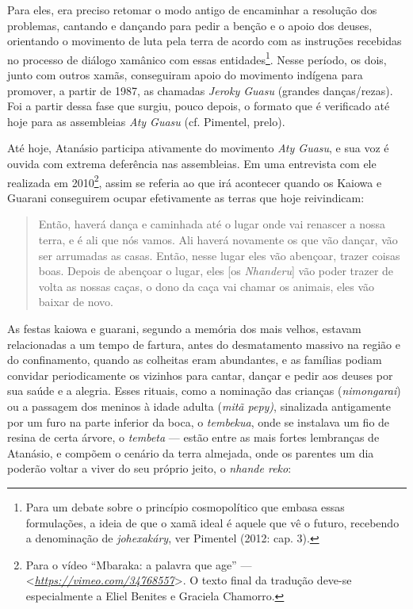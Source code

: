 Para eles, era preciso retomar o modo antigo de encaminhar a resolução
dos problemas, cantando e dançando para pedir a benção e o apoio dos
deuses, orientando o movimento de luta pela terra de acordo com as
instruções recebidas no processo de diálogo xamânico com essas
entidades\footnote{Para um debate sobre o princípio cosmopolítico que
  embasa essas formulações, a ideia de que o xamã ideal é aquele que vê
  o futuro, recebendo a denominação de \emph{johexakáry}, ver Pimentel
  (2012: cap. 3).}. Nesse período, os dois, junto com outros xamãs,
conseguiram apoio do movimento indígena para promover, a partir de 1987,
as chamadas \emph{Jeroky Guasu} (grandes danças/rezas). Foi a partir
dessa fase que surgiu, pouco depois, o formato que é verificado até hoje
para as assembleias \emph{Aty Guasu} (cf. Pimentel, prelo).

Até hoje, Atanásio participa ativamente do movimento \emph{Aty Guasu}, e
sua voz é ouvida com extrema deferência nas assembleias. Em uma
entrevista com ele realizada em 2010\footnote{Para o vídeo ``Mbaraka: a
  palavra que age'' ---
  \textless{}\href{https://vimeo.com/34768557}{\emph{https://vimeo.com/34768557}}\textgreater{}.
  O texto final da tradução deve-se especialmente a Eliel Benites e
  Graciela Chamorro.}, assim se referia ao que irá acontecer quando os
Kaiowa e Guarani conseguirem ocupar efetivamente as terras que hoje
reivindicam:

\begin{quote}
Então, haverá dança e caminhada até o lugar onde vai renascer a nossa
terra, e é ali que nós vamos. Ali haverá novamente os que vão dançar,
vão ser arrumadas as casas. Então, nesse lugar eles vão abençoar, trazer
coisas boas. Depois de abençoar o lugar, eles {[}os \emph{Nhanderu}{]}
vão poder trazer de volta as nossas caças, o dono da caça vai chamar os
animais, eles vão baixar de novo.
\end{quote}

As festas kaiowa e guarani, segundo a memória dos mais velhos, estavam
relacionadas a um tempo de fartura, antes do desmatamento massivo na
região e do confinamento, quando as colheitas eram abundantes, e as
famílias podiam convidar periodicamente os vizinhos para cantar, dançar
e pedir aos deuses por sua saúde e a alegria. Esses rituais, como a
nominação das crianças (\emph{nimongarai}) ou a passagem dos meninos à
idade adulta (\emph{mitã pepy)}, sinalizada antigamente por um furo na
parte inferior da boca, o \emph{tembekua}, onde se instalava um fio de
resina de certa árvore, o \emph{tembeta} --- estão entre as mais fortes
lembranças de Atanásio, e compõem o cenário da terra almejada, onde os
parentes um dia poderão voltar a viver do seu próprio jeito, o
\emph{nhande reko}:

